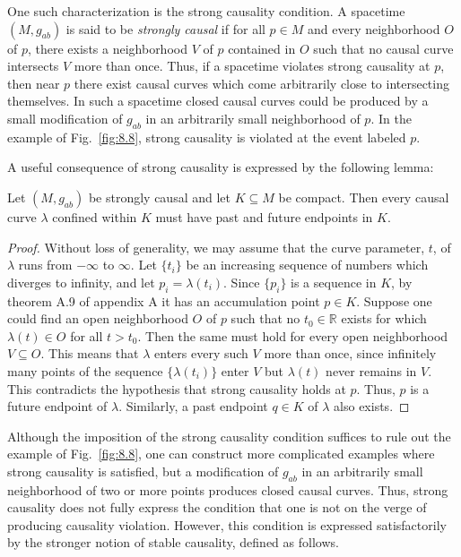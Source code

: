 

One such characterization is the strong causality condition. A spacetime
\((M,g_{ab})\) is said to be \emph{strongly causal} if for all \(p\in M\) and every
neighborhood \(O\) of \(p\), there exists a neighborhood \(V\) of \(p\) contained in
\(O\) such that no causal curve intersects \(V\) more than once. Thus, if a spacetime
violates strong causality at \(p\), then near \(p\) there exist causal curves which
come arbitrarily close to intersecting themselves. In such a spacetime closed causal
curves could be produced by a small modification of \(g_{ab}\) in an arbitrarily small
neighborhood of \(p\). In the example of Fig.~\ref{fig:8.8}, strong causality is
violated at the event labeled \(p\).

A useful consequence of strong causality is expressed by the following lemma:

\begin{lemma}\label{lem:8.2.1}
Let \((M,g_{ab})\) be strongly causal and let \(K\subseteq M\) be compact. Then
every causal curve \(\lambda\) confined within \(K\) must have past and future
endpoints in \(K\).
\end{lemma}
\begin{proof}
Without loss of generality, we may assume that the curve parameter, \(t\), of
\(\lambda\) runs from \(-\infty\) to \(\infty\). Let \(\{t_i\}\) be an increasing
sequence of numbers which diverges to infinity, and let \(p_i=\lambda(t_i)\). Since
\(\{p_i\}\) is a sequence in \(K\), by theorem A.9 of appendix A it has an
accumulation point \(p\in K\). Suppose one could find an open neighborhood \(O\) of
\(p\) such that no \(t_0\in\mathbb{R}\) exists for which \(\lambda(t)\in O\) for all
\(t>t_0\). Then the same must hold for every open neighborhood \(V\subseteq O\).
This means that \(\lambda\) enters every such \(V\) more than once, since infinitely
many points of the sequence \(\{\lambda(t_i)\}\) enter \(V\) but \(\lambda(t)\) never
remains in \(V\). This contradicts the hypothesis that strong causality holds at
\(p\). Thus, \(p\) is a future endpoint of \(\lambda\). Similarly, a past endpoint
\(q\in K\) of \(\lambda\) also exists.
\end{proof}

Although the imposition of the strong causality condition suffices to rule out the
example of Fig.~\ref{fig:8.8}, one can construct more complicated examples where
strong causality is satisfied, but a modification of \(g_{ab}\) in an arbitrarily small
neighborhood of two or more points produces closed causal curves. Thus, strong
causality does not fully express the condition that one is not on the verge of producing
causality violation. However, this condition is expressed satisfactorily by the
stronger notion of stable causality, defined as follows.

